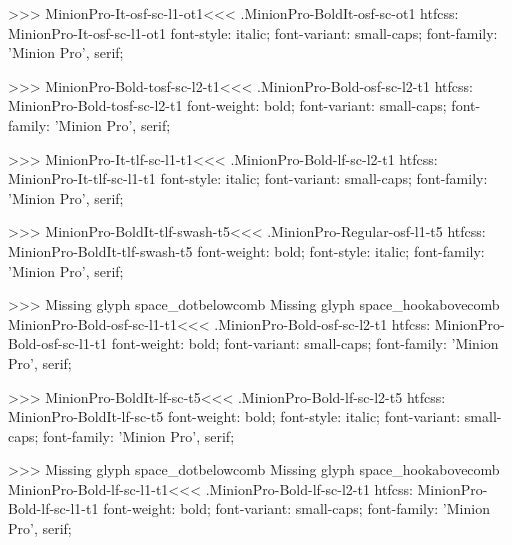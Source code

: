 {>>>
\<MinionPro-It-osf-sc-l1-ot1\><<<
.MinionPro-BoldIt-osf-sc-ot1
htfcss:  MinionPro-It-osf-sc-l1-ot1  font-style: italic; font-variant: small-caps; font-family: 'Minion Pro', serif;

>>>
\<MinionPro-Bold-tosf-sc-l2-t1\><<<
.MinionPro-Bold-osf-sc-l2-t1
htfcss:  MinionPro-Bold-tosf-sc-l2-t1  font-weight: bold; font-variant: small-caps; font-family: 'Minion Pro', serif;

>>>
\<MinionPro-It-tlf-sc-l1-t1\><<<
.MinionPro-Bold-lf-sc-l2-t1
htfcss:  MinionPro-It-tlf-sc-l1-t1  font-style: italic; font-variant: small-caps; font-family: 'Minion Pro', serif;

>>>
\<MinionPro-BoldIt-tlf-swash-t5\><<<
.MinionPro-Regular-osf-l1-t5
htfcss:  MinionPro-BoldIt-tlf-swash-t5  font-weight: bold; font-style: italic; font-family: 'Minion Pro', serif;

>>>
Missing glyph	space_dotbelowcomb
Missing glyph	space_hookabovecomb
\<MinionPro-Bold-osf-sc-l1-t1\><<<
.MinionPro-Bold-osf-sc-l2-t1
htfcss:  MinionPro-Bold-osf-sc-l1-t1  font-weight: bold; font-variant: small-caps; font-family: 'Minion Pro', serif;

>>>
\<MinionPro-BoldIt-lf-sc-t5\><<<
.MinionPro-Bold-lf-sc-l2-t5
htfcss:  MinionPro-BoldIt-lf-sc-t5  font-weight: bold; font-style: italic; font-variant: small-caps; font-family: 'Minion Pro', serif;

>>>
Missing glyph	space_dotbelowcomb
Missing glyph	space_hookabovecomb
\<MinionPro-Bold-lf-sc-l1-t1\><<<
.MinionPro-Bold-lf-sc-l2-t1
htfcss:  MinionPro-Bold-lf-sc-l1-t1  font-weight: bold; font-variant: small-caps; font-family: 'Minion Pro', serif;

}
